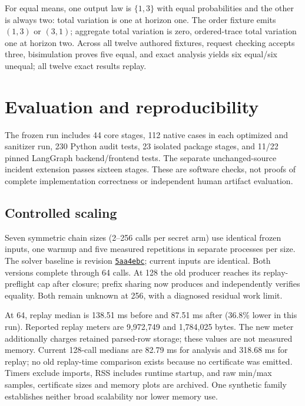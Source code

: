 \documentclass[preprint,12pt,a4paper]{elsarticle}
\begin{document}
For equal means, one output law is $\{1,3\}$ with equal probabilities and the other is always two: total variation is one at horizon one. The order fixture emits $(1,3)$ or $(3,1)$; aggregate total variation is zero, ordered-trace total variation one at horizon two. Across all twelve authored fixtures, request checking accepts three, bisimulation proves five equal, and exact analysis yields six equal/six unequal; all twelve exact results replay.

\section{Evaluation and reproducibility}
The frozen run includes 44 core stages, 112 native cases in each optimized and sanitizer run, 230 Python audit tests, 23 isolated package stages, and 11/22 pinned LangGraph backend/frontend tests. The separate unchanged-source incident extension passes sixteen stages. These are software checks, not proofs of complete implementation correctness or independent human artifact evaluation.

\subsection{Controlled scaling}
Seven symmetric chain sizes (2--256 calls per secret arm) use identical frozen inputs, one warmup and five measured repetitions in separate processes per size. The solver baseline is revision \href{https://github.com/guyoverclocked/orchlang-compiler-design-project/tree/5aa4ebc669a3fbae72d9a605be250624fd0bcbf5}{\texttt{5aa4ebc}}; current inputs are identical. Both versions complete through 64 calls. At 128 the old producer reaches its replay-preflight cap after closure; prefix sharing now produces and independently verifies equality. Both remain unknown at 256, with a diagnosed residual work limit.

At 64, replay median is 138.51 ms before and 87.51 ms after (36.8\% lower in this run). Reported replay meters are 9,972,749 and 1,784,025 bytes. The new meter additionally charges retained parsed-row storage; these values are not measured memory. Current 128-call medians are 82.79 ms for analysis and 318.68 ms for replay; no old replay-time comparison exists because no certificate was emitted. Timers exclude imports, RSS includes runtime startup, and raw min/max samples, certificate sizes and memory plots are archived. One synthetic family establishes neither broad scalability nor lower memory use.
\end{document}
